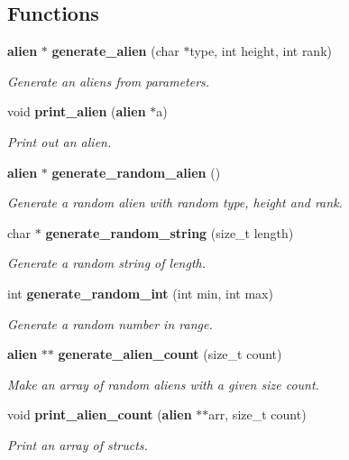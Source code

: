 \subsection*{Functions}
\begin{DoxyCompactItemize}
\item 
{\bf alien} $\ast$ {\bf generate\-\_\-alien} (char $\ast$type, int height, int rank)
\begin{DoxyCompactList}\small\item\em Generate an aliens from parameters. \end{DoxyCompactList}\item 
void {\bf print\-\_\-alien} ({\bf alien} $\ast$a)
\begin{DoxyCompactList}\small\item\em Print out an alien. \end{DoxyCompactList}\item 
{\bf alien} $\ast$ {\bf generate\-\_\-random\-\_\-alien} ()
\begin{DoxyCompactList}\small\item\em Generate a random alien with random type, height and rank. \end{DoxyCompactList}\item 
char $\ast$ {\bf generate\-\_\-random\-\_\-string} (size\-\_\-t length)
\begin{DoxyCompactList}\small\item\em Generate a random string of length. \end{DoxyCompactList}\item 
int {\bf generate\-\_\-random\-\_\-int} (int min, int max)
\begin{DoxyCompactList}\small\item\em Generate a random number in range. \end{DoxyCompactList}\item 
{\bf alien} $\ast$$\ast$ {\bf generate\-\_\-alien\-\_\-count} (size\-\_\-t count)
\begin{DoxyCompactList}\small\item\em Make an array of random aliens with a given size count. \end{DoxyCompactList}\item 
void {\bf print\-\_\-alien\-\_\-count} ({\bf alien} $\ast$$\ast$arr, size\-\_\-t count)
\begin{DoxyCompactList}\small\item\em Print an array of structs. \end{DoxyCompactList}\item 

\end{DoxyCompactItemize}

